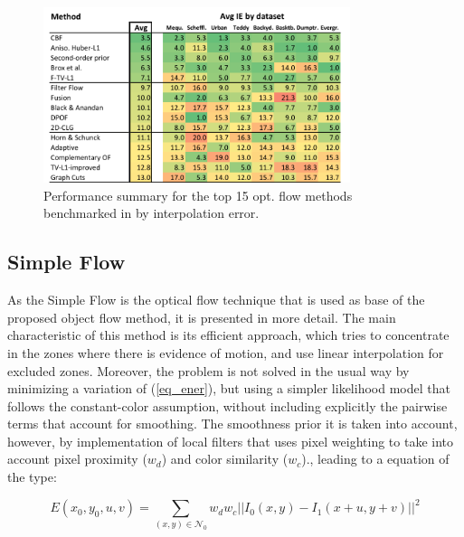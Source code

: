    \begin{figure}[thpb]
      \centering
      \includegraphics[width=0.8\textwidth]{../images/of_performance.png}
      \caption{ Performance summary for the top 15 opt. flow methods benchmarked in \cite{c17} by interpolation error. }
      \label{of_per}
   \end{figure}

\subsection{Simple Flow}

As the Simple Flow \cite{c21} is the optical flow technique that is used as base of the proposed 
object flow method, it is presented in more detail. 
The main characteristic of this method is its efficient approach, which tries to concentrate in the zones where there is evidence of motion, and use linear 
interpolation for excluded zones. 
Moreover, the problem is not solved in the usual way by minimizing a variation of (\ref{eq_ener}), but using a simpler likelihood model that 
follows the constant-color assumption, without including explicitly the pairwise terms that account for smoothing. The smoothness prior it is taken into 
account, however, by implementation of local filters that uses pixel weighting to take into account pixel proximity ($w_d$) and color similarity ($w_c$)., leading to a equation 
of the type: 

\begin{equation}
E(x_0, y_0, u, v) = \sum_{(x,y) \in \mathcal{N}_{0}} w_{d}w_{c}||  I_{0}(x,y) - I_{1}(x+u,y+v) ||^2
\label{eq_simple}
\end{equation}

